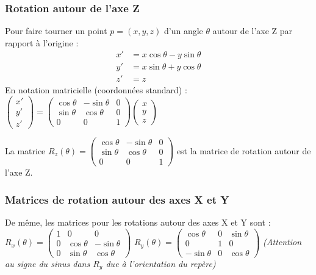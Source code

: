 \documentclass{article}
\begin{document}
\subsubsection{Rotation autour de l'axe Z}
Pour faire tourner un point $p=(x, y, z)$ d'un angle $\theta$ autour de l'axe Z par rapport à l'origine :
\begin{align*} x' &= x \cos\theta - y \sin\theta \\ y' &= x \sin\theta + y \cos\theta \\ z' &= z \end{align*}
En notation matricielle (coordonnées standard) :
$\begin{pmatrix} x' \\ y' \\ z' \end{pmatrix} = \begin{pmatrix} \cos\theta & -\sin\theta & 0 \\ \sin\theta & \cos\theta & 0 \\ 0 & 0 & 1 \end{pmatrix} \begin{pmatrix} x \\ y \\ z \end{pmatrix}$

La matrice $R_z(\theta) = \begin{pmatrix} \cos\theta & -\sin\theta & 0 \\ \sin\theta & \cos\theta & 0 \\ 0 & 0 & 1 \end{pmatrix}$ est la matrice de rotation autour de l'axe Z.

\subsubsection{Matrices de rotation autour des axes X et Y}
De même, les matrices pour les rotations autour des axes X et Y sont :
$R_x(\theta) = \begin{pmatrix} 1 & 0 & 0 \\ 0 & \cos\theta & -\sin\theta \\ 0 & \sin\theta & \cos\theta \end{pmatrix}$
$R_y(\theta) = \begin{pmatrix} \cos\theta & 0 & \sin\theta \\ 0 & 1 & 0 \\ -\sin\theta & 0 & \cos\theta \end{pmatrix}$
\textit{(Attention au signe du sinus dans $R_y$ due à l'orientation du repère)}
\end{document}
